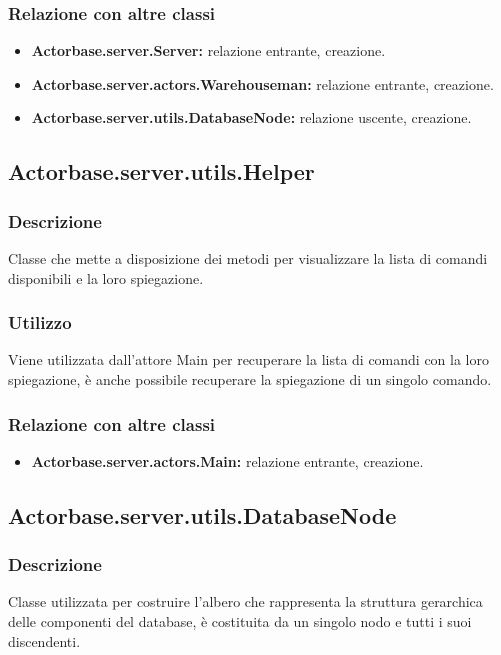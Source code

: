 \documentclass[a4paper]{article}
\begin{document}
			\subsubsection{Relazione con altre classi}
				\begin{itemize}
					\item \textbf{Actorbase.server.Server:} relazione entrante, creazione.
					\item \textbf{Actorbase.server.actors.Warehouseman:} relazione entrante, creazione.
					\item \textbf{Actorbase.server.utils.DatabaseNode:} relazione uscente, creazione. 
				\end{itemize}
				
		\subsection{Actorbase.server.utils.Helper}
			\subsubsection{Descrizione}
				Classe che mette a disposizione dei metodi per visualizzare la lista di comandi disponibili e la loro spiegazione.
				
			\subsubsection{Utilizzo}
				Viene utilizzata dall'attore Main per recuperare la lista di comandi con la loro spiegazione, è anche possibile recuperare 
				la spiegazione di un singolo comando.
				
			\subsubsection{Relazione con altre classi}
				\begin{itemize}
					\item \textbf{Actorbase.server.actors.Main:} relazione entrante, creazione. 
				\end{itemize}
			
		\subsection{Actorbase.server.utils.DatabaseNode}
			\subsubsection{Descrizione}
				Classe utilizzata per costruire l'albero che rappresenta la struttura gerarchica delle componenti del database,
				è costituita da un singolo nodo e tutti i suoi discendenti.
				
\end{document}
